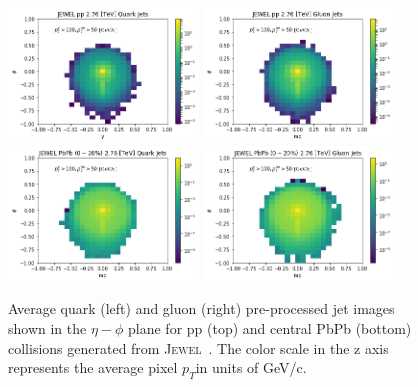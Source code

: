 \documentclass[notoc]{JHEP3}
\newcommand{\pt}{$p_{T}$}
\newcommand{\jw}{\textsc{Jewel}~}
\begin{document}
	\begin{figure}[h]
	   \centering
	   \includegraphics[width=0.45\textwidth]{plots/jewel_pp_avgQuarkJet}
	   \includegraphics[width=0.45\textwidth]{plots/jewel_pp_avgGluonJet}
	   \includegraphics[width=0.45\textwidth]{plots/jewel_pbpb020_avgQuarkJet}
	   \includegraphics[width=0.45\textwidth]{plots/jewel_pbpb020_avgGluonJet}
	   \caption{Average quark (left) and gluon (right) pre-processed jet images shown in the $\eta-\phi$ plane for pp (top) and central PbPb (bottom) collisions generated from \jw. The color scale in the z axis represents the average pixel \pt in units of GeV/c. }
	   \label{fig:ave_jetimage_jewel}
	\end{figure}
	
\end{document}
